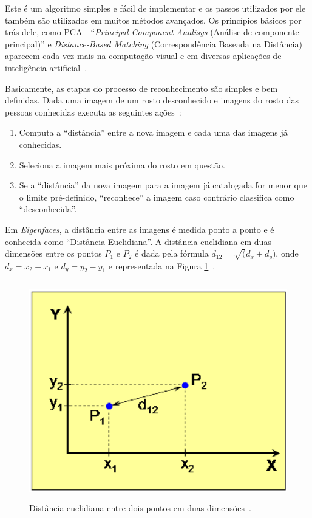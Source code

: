 Este é um algoritmo simples e fácil de implementar e os passos utilizados por ele também são utilizados em muitos métodos avançados. Os princípios básicos por trás dele, como PCA - ``\textit{Principal Component Analisys} (Análise de componente principal)'' e \textit{Distance-Based Matching} (Correspondência Baseada na Distância) aparecem cada vez mais na computação visual e em diversas aplicações de inteligência artificial~\cite{hewitt}.

Basicamente, as etapas do processo de reconhecimento são simples e bem definidas. Dada uma imagem de um rosto desconhecido e imagens do rosto das pessoas conhecidas executa as seguintes ações~\cite{hewitt}:

	\begin{enumerate}
		\item Computa a ``distância'' entre a nova imagem e cada uma das imagens já conhecidas.
		\item Seleciona a imagem mais próxima do rosto em questão.
		\item Se a ``distância'' da nova imagem para a imagem já catalogada for menor que o limite pré-definido, ``reconhece'' a imagem caso contrário classifica como ``desconhecida''.
	\end{enumerate}

Em \textit{Eigenfaces}, a distância entre as imagens é medida ponto a ponto e é conhecida como ``Distância Euclidiana''. A distância euclidiana em duas dimensões entre os pontos $P_1$ e $P_2$ é dada pela fórmula $\displaystyle d_{12} = \sqrt(d_{x} + d_{y})$, onde $\displaystyle d_x = x_2 - x_1$ e $\displaystyle d_y = y_2-y_1$ e representada na Figura \ref{distanciaEntrePontos}~\cite{hewitt}.

    \begin{figure}[hbt]
		\begin{center}
			\includegraphics[height=9.5cm,width=12.5cm]{figuras/2.FundamentacaoTeorica/graficoDistanciaEntrePontos.png}
		\end{center}
		\caption{Distância euclidiana entre dois pontos em duas dimensões~\cite{hewitt}.}
		\label{distanciaEntrePontos}
	\end{figure}


